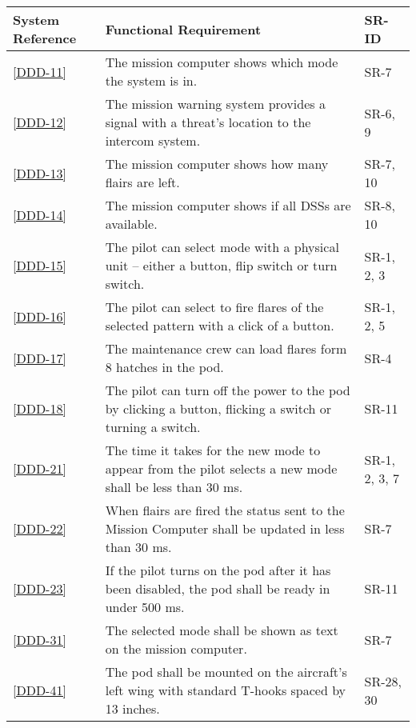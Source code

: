 \documentclass[Main]{subfiles}
\begin{document}
\begin{longtable}{l p{10.4cm} p{1.8cm} } \hline
System Reference & Functional Requirement & SR-ID\\\hline
\ref{DDD-11} & The mission computer shows which mode the system is in. & SR-7 \\

\ref{DDD-12} & The mission warning system provides a signal with a threat's location to the intercom system. & SR-6, 9 \\

\ref{DDD-13} & The mission computer shows how many flairs are left. & SR-7, 10\\

\ref{DDD-14} & The mission computer shows if all DSSs are available. & SR-8, 10\\

\ref{DDD-15} & The pilot can select mode with a physical unit -- either a button, flip switch or turn switch. & SR-1, 2, 3\\

\ref{DDD-16} & The pilot can select to fire flares of the selected pattern with a click of a button. & SR-1, 2, 5\\

\ref{DDD-17} & The maintenance crew can load flares form 8 hatches in the pod. & SR-4\\

\ref{DDD-18} & The pilot can turn off the power to the pod by clicking a button, flicking a switch or turning a switch. & SR-11\\

\ref{DDD-21} & The time it takes for the new mode to appear from the pilot selects a new mode shall be less than 30 ms. & SR-1, 2, 3, 7\\

\ref{DDD-22} & When flairs are fired the status sent to the Mission Computer shall be updated in less than 30 ms.& SR-7\\

\ref{DDD-23} & If the pilot turns on the pod after it has been disabled, the pod shall be ready in under 500 ms.& SR-11\\

\ref{DDD-31} & The selected mode shall be shown as text on the mission computer. & SR-7\\

\ref{DDD-41} &  The pod shall be mounted on the aircraft's left wing with standard T-hooks spaced by 13 inches. & SR-28, 30\\


\end{longtable}
\end{document}
